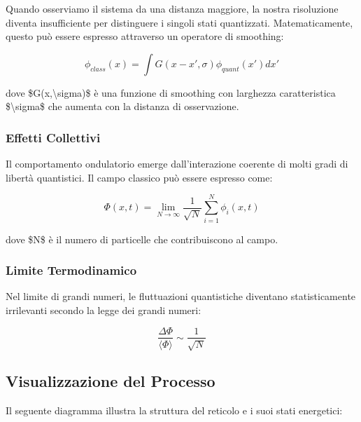 \documentclass[a4paper,11pt]{article}
\begin{document}
Quando osserviamo il sistema da una distanza maggiore, la nostra
risoluzione diventa insufficiente per distinguere i singoli stati
quantizzati. Matematicamente, questo può essere espresso attraverso un
operatore di smoothing:

\begin{displaymath}
\phi_{class}(x) = \int G(x-x', \sigma) \phi_{quant}(x') dx'
\end{displaymath}

dove \$G(x,\textbackslash{}sigma)\$ è una funzione di smoothing con larghezza
caratteristica \$\textbackslash{}sigma\$ che aumenta con la distanza di osservazione.

\subsubsection{Effetti Collettivi}\hypertarget{effetti-collettivi}{}\label{effetti-collettivi}

Il comportamento ondulatorio emerge dall'interazione coerente di molti
gradi di libertà quantistici. Il campo classico può essere espresso
come:

\begin{displaymath}
\Phi(x,t) = \lim_{N \to \infty} \frac{1}{\sqrt{N}} \sum_{i=1}^N \phi_i(x,t)
\end{displaymath}

dove \$N\$ è il numero di particelle che contribuiscono al campo.

\subsubsection{Limite Termodinamico}\hypertarget{limite-termodinamico}{}\label{limite-termodinamico}

Nel limite di grandi numeri, le fluttuazioni quantistiche diventano
statisticamente irrilevanti secondo la legge dei grandi numeri:

\begin{displaymath}
\frac{\Delta \Phi}{\langle \Phi \rangle} \sim \frac{1}{\sqrt{N}}
\end{displaymath}

\subsection{Visualizzazione del Processo}\hypertarget{visualizzazione-del-processo}{}\label{visualizzazione-del-processo}

Il seguente diagramma illustra la struttura del reticolo e i suoi stati
energetici:
\end{document}
